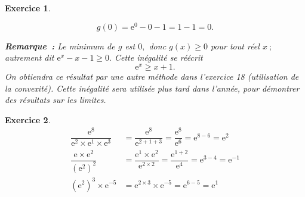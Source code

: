 \documentclass[10pt]{article}
\newtheorem{exo}{Exercice}
\begin{document}
\begin{exo}
\begin{multicols}{2}
\begin{center}
\medskip

\[g(0)=\text{e}^0-0-1=1-1=0.\]
\end{center}



\end{multicols}

\medskip

\textbf{Remarque~:} Le minimum de $g$ est $0,$ donc $g(x)\geq 0$ pour tout réel $x~;$ autrement dit $\text{e}^x-x-1\geq 0.$ Cette inégalité se réécrit
\[\text{e}^x\geq x+1.\]
On obtiendra ce résultat par une autre méthode dans l'exercice 18 (utilisation de la convexité). Cette inégalité sera utilisée plus tard dans l'année, pour démontrer des résultats sur les limites.


\end{exo}

\begin{exo}


\begin{align*}
\dfrac{\text{e}^8}{\text{e}^2\times \text{e}^1\times \text{e}^3}&=\dfrac{\text{e}^8}{\text{e}^{2+1+3}}=\dfrac{\text{e}^8}{\text{e}^{6}}=\text{e}^{8-6}=\text{e}^{2}\\
\dfrac{\text{e}\times\text{e}^2}{\left(\text{e}^2\right)^2}
&=\dfrac{\text{e}^1\times\text{e}^2}{\text{e}^{2\times 2}}
=\dfrac{\text{e}^{1+2}}{\text{e}^{4}}=\text{e}^{3-4}=\text{e}^{-1}\\
\left(\text{e}^2\right)^3\times\text{e}^{-5}&=\text{e}^{2\times 3}\times\text{e}^{-5}=\text{e}^{6-5}=\text{e}^{1}
\end{align*}

\end{exo}
\end{document}
